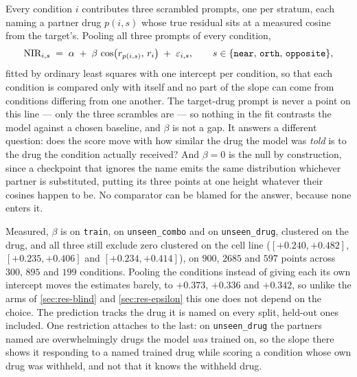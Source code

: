 Every condition $i$ contributes three scrambled prompts, one per stratum,
each naming a partner drug $p(i,s)$ whose true residual sits at a measured cosine
from the target's. Pooling all three prompts of every condition,
\begin{equation}
 \textrm{NIR}_{i,s} \;=\; \alpha \;+\; \beta\,
   \cos\!\big(r_{p(i,s)},\, r_{i}\big) \;+\; \varepsilon_{i,s},
 \qquad s \in \{\texttt{near},\, \texttt{orth},\, \texttt{opposite}\},
\end{equation}
fitted by ordinary least squares with one intercept per condition, so that each
condition is compared only with itself and no part of the slope can come from
conditions differing from one another. The target-drug prompt is never a point on
this line --- only
the three scrambles are --- so nothing in the fit contrasts the model against a
chosen baseline, and $\beta$ is not a gap. It answers a different question: does
the score move with how similar the drug the model was \emph{told} is to the drug
the condition actually received? And $\beta = 0$ is the null by construction, since
a checkpoint that ignores the name emits the same distribution whichever partner
is substituted, putting its three points at one height whatever their cosines
happen to be. No comparator can be blamed for the answer, because none enters it.

Measured, $\beta$ is  on \texttt{train},
 on \texttt{unseen\_combo} and
 on \texttt{unseen\_drug}, clustered on the drug, and
all three still exclude zero clustered on the cell line ($[+0.240, +0.482]$,
$[+0.235, +0.406]$ and $[+0.234, +0.414]$), on $900$, $\num{2685}$ and $597$
points across $300$, $895$ and $199$ conditions. Pooling the conditions instead
of giving each its own intercept moves the estimates barely, to $+0.373$, $+0.336$
and $+0.342$, so unlike the arms of \cref{sec:res-blind} and
\cref{sec:res-epsilon} this one does not depend on the choice. The prediction tracks the drug it is named on every split,
held-out ones included. One restriction attaches to the last: on
\texttt{unseen\_drug} the partners named are overwhelmingly drugs the model
\emph{was} trained on, so the slope there shows it responding to a named trained
drug while scoring a condition whose own drug was withheld, and not that it knows
the withheld drug.


